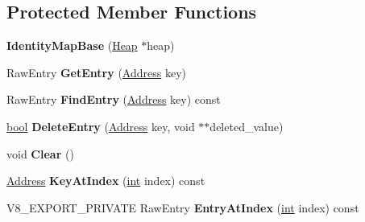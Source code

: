 \subsection*{Protected Member Functions}
\begin{DoxyCompactItemize}
\item 
\mbox{\label{classv8_1_1internal_1_1IdentityMapBase_ab9f30167bbfc971aee8022a7d8297825}} 
{\bfseries Identity\+Map\+Base} (\mbox{\hyperlink{classv8_1_1internal_1_1Heap}{Heap}} $\ast$heap)
\item 
\mbox{\label{classv8_1_1internal_1_1IdentityMapBase_a488fac529835d593d0e7fb8933c200de}} 
Raw\+Entry {\bfseries Get\+Entry} (\mbox{\hyperlink{classuintptr__t}{Address}} key)
\item 
\mbox{\label{classv8_1_1internal_1_1IdentityMapBase_a628560b49e6e0392e7f7788b0f84902f}} 
Raw\+Entry {\bfseries Find\+Entry} (\mbox{\hyperlink{classuintptr__t}{Address}} key) const
\item 
\mbox{\label{classv8_1_1internal_1_1IdentityMapBase_a4d2bfab2ce640719ef62830c5352a19c}} 
\mbox{\hyperlink{classbool}{bool}} {\bfseries Delete\+Entry} (\mbox{\hyperlink{classuintptr__t}{Address}} key, void $\ast$$\ast$deleted\+\_\+value)
\item 
\mbox{\label{classv8_1_1internal_1_1IdentityMapBase_abf639aef94ebb3c75d4dec921e0e81eb}} 
void {\bfseries Clear} ()
\item 
\mbox{\label{classv8_1_1internal_1_1IdentityMapBase_a81f2963a8bfb6d1f874aca9db6095878}} 
\mbox{\hyperlink{classuintptr__t}{Address}} {\bfseries Key\+At\+Index} (\mbox{\hyperlink{classint}{int}} index) const
\item 
\mbox{\label{classv8_1_1internal_1_1IdentityMapBase_a993371e3c52fecbad4306794d98a3b9e}} 
V8\+\_\+\+E\+X\+P\+O\+R\+T\+\_\+\+P\+R\+I\+V\+A\+TE Raw\+Entry {\bfseries Entry\+At\+Index} (\mbox{\hyperlink{classint}{int}} index) const
\item 
\mbox{\label{classv8_1_1internal_1_1IdentityMapBase_a7b91ba7bb7774eea1cc5e7697159f21d}} 
$$
\end{DoxyCompactItemize}
